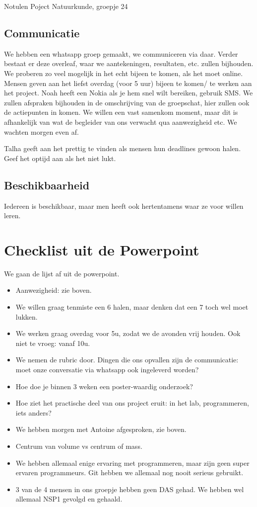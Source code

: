 \documentclass[11pt,a4paper]{article}
\begin{document}
\begin{Minutes}{Notulen Poject Natuurkunde, groepje 24}
\subsection{Communicatie}
We hebben een whatsapp groep gemaakt, we communiceren via daar. Verder bestaat er deze overleaf, waar we aantekeningen, resultaten, etc. zullen bijhouden. We proberen zo veel mogelijk in het echt bijeen te komen, als het moet online. Mensen geven aan het liefst overdag (voor 5 uur) bijeen te komen/ te werken aan het project. Noah heeft een Nokia als je hem snel wilt bereiken, gebruik SMS. We zullen afspraken bijhouden in de omschrijving van de groepschat, hier zullen ook de actiepunten in komen. We willen een vast samenkom moment, maar dit is afhankelijk van wat de begleider van ons verwacht qua aanwezigheid etc. We wachten morgen even af.

Talha geeft aan het prettig te vinden als mensen hun deadlines gewoon halen. Geef het optijd aan als het niet lukt.

\subsection{Beschikbaarheid}
Iedereen is beschikbaar, maar men heeft ook hertentamens waar ze voor willen leren.

\section{Checklist uit de Powerpoint}
We gaan de lijst af uit de powerpoint.
\begin{itemize}
    \item Aanwezigheid: zie boven.
    \item We willen graag tenmiste een 6 halen, maar denken dat een 7 toch wel moet lukken.
    \item We werken graag overdag voor 5u, zodat we de avonden vrij houden. Ook niet te vroeg: vanaf 10u.
    \item We nemen de rubric door. Dingen die ons opvallen zijn de communicatie: moet onze conversatie via whatsapp ook ingeleverd worden? 
    \item Hoe doe je binnen 3 weken een poster-waardig onderzoek?
    \item Hoe ziet het practische deel van ons project eruit: in het lab, programmeren, iets anders?
    \item We hebben morgen met Antoine afgesproken, zie boven.
    \item Centrum van volume vs centrum of mass.
    \item We hebben allemaal enige ervaring met programmeren, maar zijn geen super ervaren programmeurs. Git hebben we allemaal nog nooit serieus gebruikt.
    \item 3 van de 4 mensen in ons groepje hebben geen DAS gehad. We hebben wel allemaal NSP1 gevolgd en gehaald. 
\end{itemize}




\end{Minutes}
\end{document}
